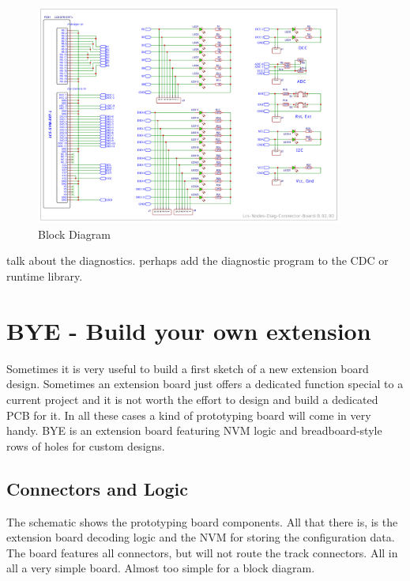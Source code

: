 \begin{figure}[htbp]
    \centering
    \includegraphics[page=1, width=0.9\textwidth]{./Schematics/Schematic_LcsNodes-Diagnostic-Board.pdf}
    \caption{Block Diagram}
\end{figure}
\FloatBarrier

talk about the diagnostics. perhaps add the diagnostic program to the CDC or runtime library.

\section{BYE - Build your own extension}

Sometimes it is very useful to build a first sketch of a new extension board design. Sometimes an extension board just offers a dedicated function special to a current project and it is not worth the effort to design and build a dedicated PCB for it. In all these cases a kind of prototyping board will come in very handy. BYE is an extension board featuring NVM logic and breadboard-style rows of holes for custom designs. 


\subsection{Connectors and Logic}

The schematic shows the prototyping board components. All that there is, is the extension board decoding logic and the NVM for storing the configuration data. The board features all connectors, but will not route the track connectors. All in all a very simple board. Almost too simple for a block diagram.

